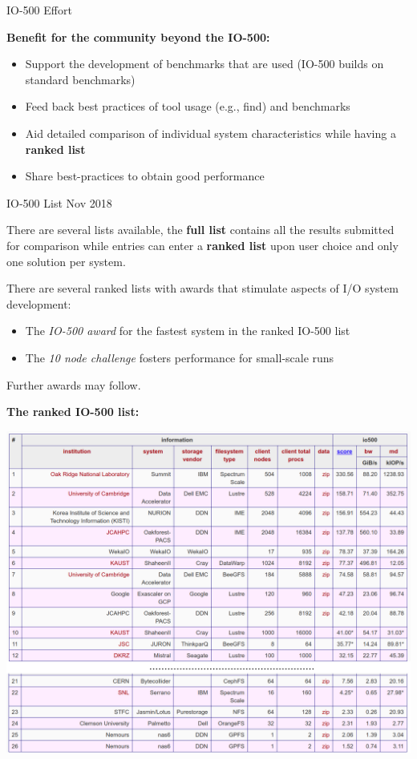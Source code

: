 \documentclass[portrait,a0paper,fontscale=0.4]{baposter}
\newcommand{\compresslist}{%
\setlength{\itemsep}{1pt}%
\setlength{\parskip}{0pt}%
\setlength{\parsep}{0pt}%
}
\begin{document}
\begin{poster}
\begin{posterbox}[name=io500,column=1,span=2]{IO-500 Effort}
\vspace*{-1em}

\textbf{Benefit for the community beyond the IO-500:}
\vspace*{-1em}
\begin{itemize} \compresslist
\item Support the development of benchmarks that are used (IO-500 builds on standard benchmarks)
\item Feed back best practices of tool usage (e.g., find) and benchmarks
\item Aid detailed comparison of individual system characteristics while having a \textbf{ranked list}
\item Share best-practices to obtain good performance
\end{itemize}


\end{posterbox}


\begin{posterbox}[name=io500res,column=1,above=bottom,below=io500]{IO-500 List Nov 2018}

There are several lists available, the \textbf{full list} contains all the results submitted for comparison while entries can enter a \textbf{ranked list} upon user choice and only one solution per system.

There are several ranked lists with awards that stimulate aspects of I/O system development:
\vspace*{-0.75em}
\begin{itemize}\compresslist
  \item The \textit{IO-500 award} for the fastest system in the ranked IO-500 list
  \item The \textit{10 node challenge} fosters performance for small-scale runs
\end{itemize}
\vspace*{-1em}
Further awards may follow.

\textbf{The ranked IO-500 list:}

\includegraphics[width=\textwidth]{io500}



\end{posterbox}
\end{poster}
\end{document}
